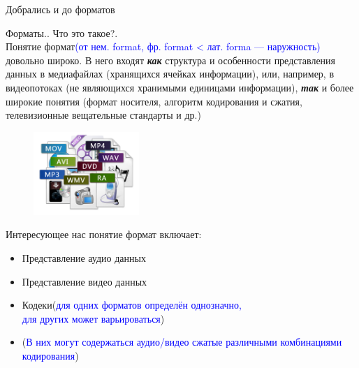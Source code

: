 \documentclass[aspectratio=169]{beamer}
\newcommand{\blu}{\textcolor{blue}}
\newcommand{\n}{\normalsize}
\begin{document}
\begin{frame}[shrink=5]{Добрались и до форматов}%

Форматы.. Что это такое?.\\ Понятие формат\footnotesize \blu{(от нем. format, фр. format < лат. forma — наружность)} \n довольно широко. В него входят \textit{\textbf{как}} структура и особенности представления данных в медиа\alert{файлах} (хранящихся ячейках информации), или, например, в \alert{видеопотоках} (не являющихся хранимыми единицами информации), \textit{\textbf{так}} и более широкие понятия (формат носителя, алгоритм кодирования и сжатия, телевизионные вещательные стандарты и др.)

\begin{figure}
\includegraphics[width=4cm]{format.png}
\end{figure}

Интересующее нас понятие формат включает:

\begin{itemize}
\setlength\itemsep{2mm}
    \item \small Представление аудио данных
    \item Представление видео данных
    \item Кодеки(\scriptsize\blu{для одних форматов определён однозначно,\\ для других может варьироваться})
    \item {}(\scriptsize\blu{В них могут содержаться аудио/видео сжатые различными комбинациями кодирования})
\end{itemize}
\end{frame}
\end{document}
